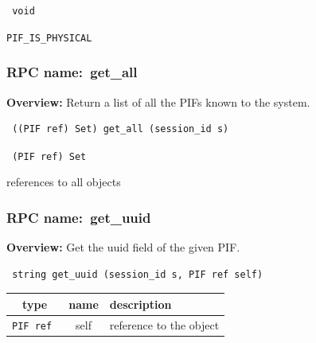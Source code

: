 \vspace{0.3cm}

{\tt 
void
}



\vspace{0.3cm}

 {\tt PIF\_IS\_PHYSICAL}

\vspace{0.6cm}
\subsubsection{RPC name:~get\_all}

{\bf Overview:} 
Return a list of all the PIFs known to the system.

\begin{verbatim} ((PIF ref) Set) get_all (session_id s)\end{verbatim}


\vspace{0.3cm}

{\tt 
(PIF ref) Set
}


references to all objects
\vspace{0.3cm}
\vspace{0.3cm}
\vspace{0.3cm}
\subsubsection{RPC name:~get\_uuid}

{\bf Overview:} 
Get the uuid field of the given PIF.

\begin{verbatim} string get_uuid (session_id s, PIF ref self)\end{verbatim}



 
\vspace{0.3cm}
\begin{tabular}{|c|c|p{7cm}|}
 \hline
{\bf type} & {\bf name} & {\bf description} \\ \hline
{\tt PIF ref } & self & reference to the object \\ \hline 

\end{tabular}

\vspace{0.3cm}


